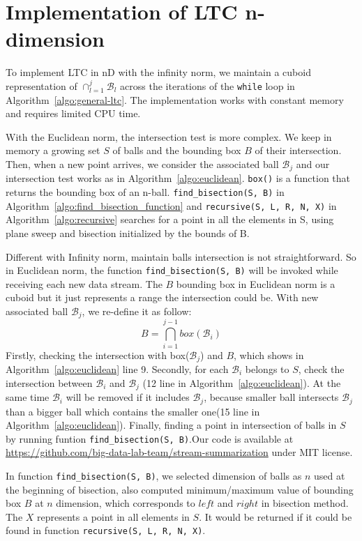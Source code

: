 \section{Implementation of LTC n-dimension}
To implement LTC in nD with the infinity norm, we maintain a cuboid
representation of $\cap_{l=1}^j{\mathcal{B}_l}$ across the
iterations of the \texttt{while} loop in
Algorithm~\ref{algo:general-ltc}. The implementation works with
constant memory and requires limited CPU time.

With the Euclidean norm, the intersection test is more complex. We keep in
memory a growing set $S$ of balls and the bounding box $B$ of their
intersection. Then, when a new point arrives, we consider the associated ball
$\mathcal{B}_j$ and our intersection test works as in
Algorithm~\ref{algo:euclidean}. \texttt{box()} is a function that returns the
bounding box of an n-ball. \texttt{find\_bisection(S, B)} in
Algorithm~\ref{algo:find_bisection_function} and \texttt{recursive(S, L, R, N,
X)} in Algorithm~\ref{algo:recursive} searches for a point in all the  elements
in S, using plane sweep and bisection initialized by the bounds of B.


Different with Infinity norm, maintain balls intersection is not
straightforward. So in Euclidean norm, the function  \texttt{find\_bisection(S,
B)} will be invoked while receiving each new data  stream. The $B$ bounding box
in Euclidean norm is a cuboid but it just  represents a range the intersection
could be. With new associated ball  $\mathcal{B}_j$, we re-define it as follow:
\begin{equation*}
    B = \bigcap_{i=1}^{j-1} box(\mathcal{B}_i) 
\end{equation*}
Firstly, checking the intersection with box($\mathcal{B}_j$) and $B$, which
shows in Algorithm~\ref{algo:euclidean} line 9. Secondly, for each
$\mathcal{B}_i$ belongs to $S$, check the intersection between $\mathcal{B}_i$
and $\mathcal{B}_j$ (12 line in Algorithm~\ref{algo:euclidean}). At the same
time $\mathcal{B}_i$ will be removed if it includes $\mathcal{B}_j$, because
smaller ball intersects $\mathcal{B}_j$ than a bigger ball which contains the
smaller one(15 line in Algorithm~\ref{algo:euclidean}). Finally, finding a point
in intersection of balls in $S$ by running funtion \texttt{find\_bisection(S,
B)}.Our code is available at
\url{https://github.com/big-data-lab-team/stream-summarization} under MIT
license.



In function \texttt{find\_bisection(S, B)}, we selected dimension of balls as
$n$ used at the beginning of bisection, also computed minimum/maximum value of
bounding box $B$ at $n$ dimension, which corresponds to $left$ and $right$ in
bisection method. The $X$ represents a point in all elements in $S$. It would be
returned if it could be found in function \texttt{recursive(S, L, R, N, X)}.


